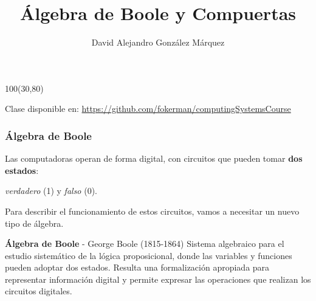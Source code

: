 \documentclass[aspectratio=169]{beamer}
\title{\Huge Álgebra de Boole y Compuertas}
\author{David Alejandro González Márquez}
\date{}
\begin{document}
\begin{frame}[plain]
    \titlepage
    \begin{textblock}{100}(30,80)
    \begin{tcolorbox}[size=small,width=\textwidth,colback={gray!30},title={}]
    \begin{center}
     \scriptsize Clase disponible en: \url{https://github.com/fokerman/computingSystemsCourse}
    \end{center}
    \end{tcolorbox}
    \end{textblock}
\end{frame}

\begin{frame}[fragile]
    \frametitle{Álgebra de Boole}
    Las computadoras operan de forma digital, con circuitos que pueden tomar \textbf{dos estados}:\\
    \begin{center}
    \textit{verdadero} (1) y \textit{falso} (0).\\ 
    \end{center}
    \bigskip
    Para describir el funcionamiento de estos circuitos, vamos a necesitar un nuevo tipo de álgebra.\\
    \bigskip
    \pause
    \begin{block}{\textbf{Álgebra de Boole} {\small- George Boole (1815-1864)}}
    Sistema algebraico para el estudio sistemático de la lógica proposicional, 
    donde las variables y funciones pueden adoptar dos estados.
    Resulta una formalización apropiada para representar información digital y permite expresar las operaciones que realizan los circuitos digitales.
    \end{block}    
\end{frame}
\end{document}
